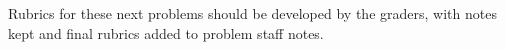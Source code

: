 \documentclass[quiz]{mcs}
\begin{document}




\examspace

\begin{staffnotes}
Rubrics for these next problems should be developed by the graders,
with notes kept and final rubrics added to problem staff notes.
\end{staffnotes}




\end{document}
